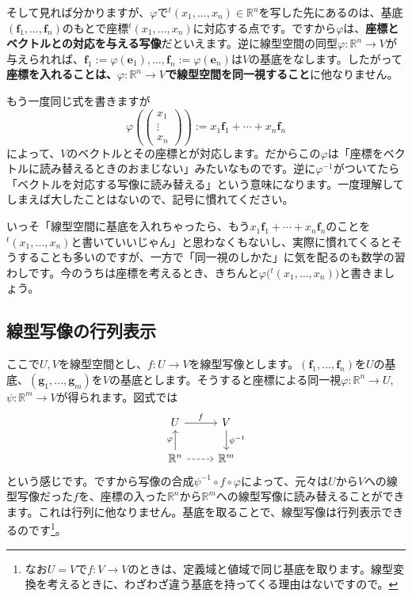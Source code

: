 そして見れば分かりますが、$\varphi$で${}^t(x_1, \ldots, x_n) \in \mathbb{R}^n$を写した先にあるのは、基底$(\bm{f}_1, \ldots, \bm{f}_n)$のもとで座標${}^t(x_1, \ldots, x_n)$に対応する点です。ですから$\varphi$は、\textbf{座標とベクトルとの対応を与える写像}だといえます。逆に線型空間の同型$\varphi\colon \mathbb{R}^n\rightarrow V$が与えられれば、$\bm{f}_1 := \varphi(\bm{e}_1), \ldots, \bm{f}_n := \varphi(\bm{e}_n)$は$V$の基底をなします。したがって\textbf{座標を入れることは、$\varphi\colon \mathbb{R}^n \rightarrow V$で線型空間を同一視すること}に他なりません。

もう一度同じ式を書きますが
\[
\varphi\left(
\begin{pmatrix}
x_1 \\
\vdots \\
x_n
\end{pmatrix}
\right)
:= x_1 \bm{f}_1 + \cdots + x_n \bm{f}_n
\]
によって、$V$のベクトルとその座標とが対応します。だからこの$\varphi$は「座標をベクトルに読み替えるときのおまじない」みたいなものです。逆に$\varphi^{-1}$がついてたら「ベクトルを対応する写像に読み替える」という意味になります。一度理解してしまえば大したことはないので、記号に慣れてください。

いっそ「線型空間に基底を入れちゃったら、もう$x_1\bm{f}_1 + \cdots + x_n\bm{f}_n$のことを${}^t(x_1, \ldots, x_n)$と書いていいじゃん」と思わなくもないし、実際に慣れてくるとそうすることも多いのですが、一方で「同一視のしかた」に気を配るのも数学の習わしです。今のうちは座標を考えるとき、きちんと$\varphi\bigl({}^t(x_1, \ldots, x_n)\bigr)$と書きましょう。

\subsection{線型写像の行列表示}

ここで$U, V$を線型空間とし、$f\colon U\rightarrow V$を線型写像とします。$(\bm{f}_1, \ldots, \bm{f}_n)$を$U$の基底、$(\bm{g}_1, \ldots, \bm{g}_m)$を$V$の基底とします。そうすると座標による同一視$\varphi\colon \mathbb{R}^n\rightarrow U$, $\psi\colon\mathbb{R}^m\rightarrow V$が得られます。図式では
\[
\begin{tikzcd}
U \arrow{r}{f} & V \arrow{d}{\psi^{-1}} \\
\mathbb{R}^n \arrow{u}{\varphi} \arrow[dashed]{r} & \mathbb{R}^m
\end{tikzcd}
\]
という感じです。ですから写像の合成$\psi^{-1}\circ f\circ\varphi$によって、元々は$U$から$V$への線型写像だった$f$を、座標の入った$\mathbb{R}^n$から$\mathbb{R}^m$への線型写像に読み替えることができます。これは行列に他なりません。基底を取ることで、線型写像は行列表示できるのです\footnote{なお$U = V$で$f\colon V \rightarrow V$のときは、定義域と値域で同じ基底を取ります。線型変換を考えるときに、わざわざ違う基底を持ってくる理由はないですので。}。

